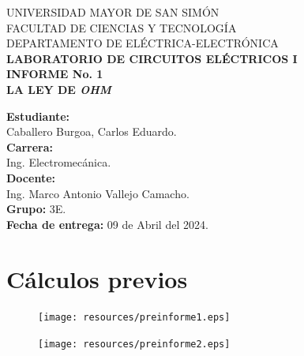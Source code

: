 \documentclass[letter,11pt]{article}
\begin{document}
\begin{titlepage}
    \begin{center}
        {\Large UNIVERSIDAD MAYOR DE SAN SIMÓN}\\
        \vspace*{0.15cm}
        {\large FACULTAD DE CIENCIAS Y TECNOLOGÍA}\\
        \vspace*{0.10cm}
        DEPARTAMENTO DE ELÉCTRICA-ELECTRÓNICA\\
        \vspace*{3.0cm}
        {\Large \textbf{LABORATORIO DE CIRCUITOS ELÉCTRICOS I}}\\
        \vspace*{0.3cm}
        {\Large \textbf{INFORME No. 1}}\\
        \vspace*{3.5cm}
        {\Large \textbf{LA LEY DE \emph{OHM}}}\\
    \end{center}

    \vspace*{6.4cm}
    \leftskip=7.95cm
    \noindent
    \textbf{Estudiante:}\\
    Caballero Burgoa, Carlos Eduardo.\\
    \newline
    \textbf{Carrera:}\\
    Ing. Electromecánica.\\
    \newline
    \textbf{Docente:}\\
    Ing. Marco Antonio Vallejo Camacho.\\
    \newline
    \textbf{Grupo:} 3E.\\
    \textbf{Fecha de entrega:} 09 de Abril del 2024.\\
\end{titlepage}

\section{Cálculos previos}

\begin{figure}[!h]
\centering
\texttt{[image: resources/preinforme1.eps]}
\end{figure}

\begin{figure}[!h]
\centering
\texttt{[image: resources/preinforme2.eps]}
\end{figure}
\end{document}
